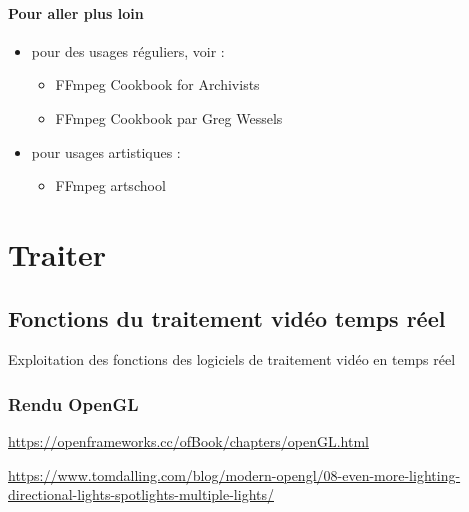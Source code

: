 \documentclass[
  french,
]{book}
\providecommand{\tightlist}{%
  \setlength{\itemsep}{0pt}\setlength{\parskip}{0pt}}
\begin{document}
\hypertarget{pour-aller-plus-loin-1}{%
\subsubsection{Pour aller plus loin}\label{pour-aller-plus-loin-1}}

\begin{itemize}
\item
  pour des usages réguliers, voir :

  \begin{itemize}
  \tightlist
  \item
    FFmpeg Cookbook for Archivists \citep{kromer_FFmpegCookbookArchivists_2020}
  \item
    FFmpeg Cookbook par Greg Wessels \citep{wessels_FFmpegCookbook_2017}
  \end{itemize}
\item
  pour usages artistiques :

  \begin{itemize}
  \tightlist
  \item
    FFmpeg artschool \citep{associationofmovingimagearchivists_FFmpegArtschool_2020}
  \end{itemize}
\end{itemize}

\hypertarget{traiter}{%
\chapter{Traiter}\label{traiter}}

\hypertarget{fonctions-du-traitement-viduxe9o-temps-ruxe9el}{%
\section{Fonctions du traitement vidéo temps réel}\label{fonctions-du-traitement-viduxe9o-temps-ruxe9el}}

Exploitation des fonctions des logiciels de traitement vidéo en temps réel

\hypertarget{rendu-opengl}{%
\subsection{Rendu OpenGL}\label{rendu-opengl}}

\url{https://openframeworks.cc/ofBook/chapters/openGL.html}

\url{https://www.tomdalling.com/blog/modern-opengl/08-even-more-lighting-directional-lights-spotlights-multiple-lights/}
\end{document}
